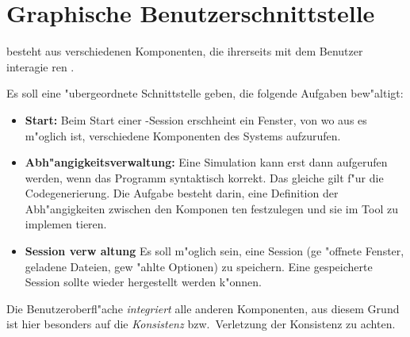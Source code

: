 \section{Graphische Benutzerschnittstelle}
\label{sec:gui}

\Mist{} besteht aus verschiedenen Komponenten, die ihrerseits mit dem
Benutzer interagie ren .

Es soll eine "ubergeordnete Schnittstelle geben, die folgende Aufgaben
bew"altigt:


\begin{itemize}
\item\textbf{Start:} Beim Start einer \Mist-Session erschheint ein Fenster,
  von wo aus es m"oglich ist, verschiedene Komponenten des Systems
  aufzurufen.
\item\textbf{Abh"angigkeitsverwaltung:} Eine Simulation kann erst dann
  aufgerufen werden, wenn das Programm syntaktisch korrekt.  Das gleiche
  gilt f"ur die Codegenerierung. Die Aufgabe besteht darin, eine Definition
  der Abh"angigkeiten zwischen den Komponen ten festzulegen und sie im Tool
  zu implemen tieren.
\item\textbf{Session verw altung} Es soll m"oglich sein, eine Session (ge
  "offnete Fenster, geladene Dateien, gew "ahlte Optionen) zu speichern.
  Eine gespeicherte Session sollte wieder hergestellt werden k"onnen.
\end{itemize}

Die Benutzeroberfl"ache \emph{integriert} alle anderen Komponenten, aus
diesem Grund ist hier besonders auf die \emph{Konsistenz} bzw.\ Verletzung
der Konsistenz zu achten.



